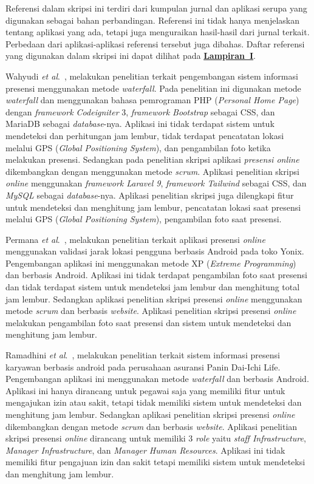 Referensi dalam skripsi ini terdiri dari kumpulan jurnal dan aplikasi serupa yang digunakan sebagai bahan perbandingan. Referensi ini tidak hanya menjelaskan tentang aplikasi yang ada, tetapi juga menguraikan hasil-hasil dari jurnal terkait. Perbedaan dari aplikasi-aplikasi referensi tersebut juga dibahas. Daftar referensi yang digunakan dalam skripsi ini dapat dilihat pada \hyperref[sec:referensi]{\textbf{Lampiran~I}}.

Wahyudi \textit{et al}.~\cite{wahyudi2021pengembangan}, melakukan penelitian terkait pengembangan sistem informasi presensi menggunakan metode \textit{waterfall}. Pada penelitian ini digunakan metode \textit{waterfall} dan menggunakan bahasa pemrograman PHP (\textit{Personal Home Page}) dengan \textit{framework Codeigniter} 3, \textit{framework Bootstrap} sebagai CSS, dan MariaDB sebagai \textit{database}-nya. Aplikasi ini tidak terdapat sistem untuk mendeteksi dan perhitungan jam lembur, tidak terdapat pencatatan lokasi melalui GPS (\textit{Global Positioning System}), dan pengambilan foto ketika melakukan presensi. Sedangkan pada penelitian skripsi aplikasi \textit{presensi online} dikembangkan dengan menggunakan metode \textit{scrum}. Aplikasi penelitian skripsi \textit{online} menggunakan \textit{framework Laravel 9}, \textit{framework Tailwind} sebagai CSS, dan \textit{MySQL} sebagai \textit{database}-nya. Aplikasi penelitian skripsi juga dilengkapi fitur untuk mendeteksi dan menghitung jam lembur, pencatatan lokasi saat presensi melalui GPS (\textit{Global Positioning System}), pengambilan foto saat presensi.

Permana \textit{et al}.~\cite{permana2022aplikasi}, melakukan penelitian terkait aplikasi presensi \textit{online} menggunakan validasi jarak lokasi pengguna berbasis Android pada toko Yonix. Pengembangan aplikasi ini menggunakan metode XP (\textit{Extreme Programming}) dan berbasis Android. Aplikasi ini tidak terdapat pengambilan foto saat presensi dan tidak terdapat sistem untuk mendeteksi jam lembur dan menghitung total jam lembur. Sedangkan aplikasi penelitian skripsi presensi \textit{online} menggunakan metode \textit{scrum} dan berbasis \textit{website}. Aplikasi penelitian skripsi presensi \textit{online} melakukan pengambilan foto saat presensi dan sistem untuk mendeteksi dan menghitung jam lembur.

Ramadhini \textit{et al}.~\cite{ramadhini2023sistem}, melakukan penelitian terkait sistem informasi presensi karyawan berbasis android pada perusahaan asuransi Panin Dai-Ichi Life. Pengembangan aplikasi ini menggunakan metode \textit{waterfall} dan berbasis Android. Aplikasi ini hanya dirancang untuk pegawai saja yang memiliki fitur untuk mengajukan izin atau sakit, tetapi tidak memiliki sistem untuk mendeteksi dan menghitung jam lembur. Sedangkan aplikasi penelitian skripsi presensi \textit{online} dikembangkan dengan metode \textit{scrum} dan berbasis \textit{website}. Aplikasi penelitian skripsi presensi \textit{online} dirancang untuk memiliki 3 \textit{role} yaitu \textit{staff Infrastructure}, \textit{Manager Infrastructure}, dan \textit{Manager Human Resources}. Aplikasi ini tidak memiliki fitur pengajuan izin dan sakit tetapi memiliki sistem untuk mendeteksi dan menghitung jam lembur.

